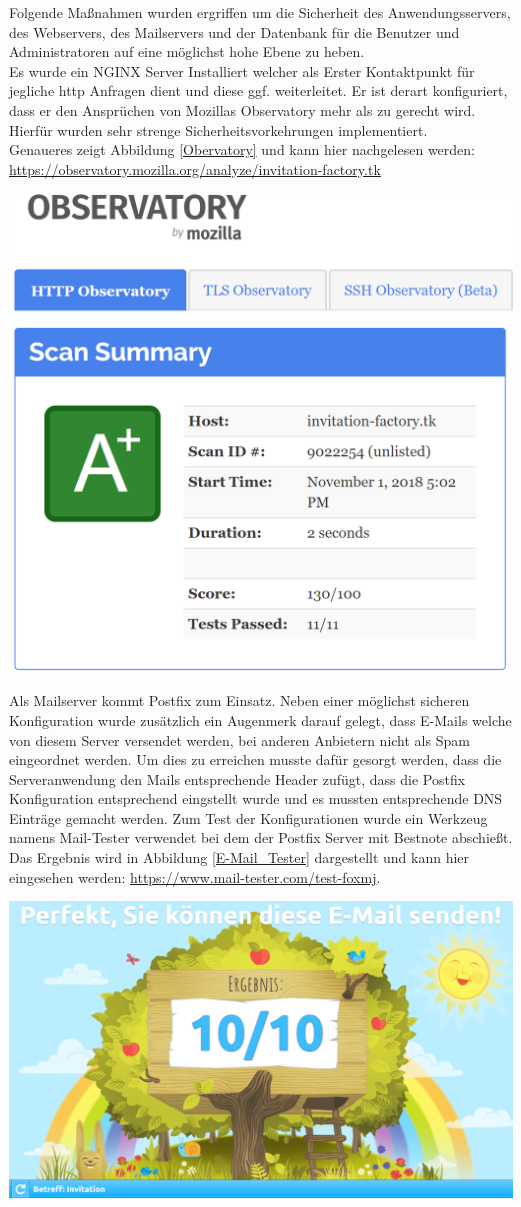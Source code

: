 \documentclass[landscape,a0paper,fontscale=0.35]{baposter} %
\begin{document}
\begin{poster}
{Folgende Maßnahmen wurden ergriffen um die Sicherheit des Anwendungsservers, des Webservers, des Mailservers und der Datenbank für die Benutzer und Administratoren auf eine möglichst hohe Ebene zu heben.\\ 
Es wurde ein NGINX Server Installiert welcher als Erster Kontaktpunkt für jegliche http Anfragen dient und diese ggf. weiterleitet. Er ist derart konfiguriert, dass er den Ansprüchen von Mozillas Observatory mehr als zu gerecht wird. Hierfür wurden sehr strenge Sicherheitsvorkehrungen implementiert.\\ Genaueres zeigt Abbildung \ref{Obervatory} und kann hier nachgelesen werden: \url{https://observatory.mozilla.org/analyze/invitation-factory.tk}
\begin{center}
	\includegraphics[width=0.45\linewidth]{Observatory.PNG}
	\label{Obervatory}
\end{center}
Als Mailserver kommt Postfix zum Einsatz. Neben einer möglichst sicheren Konfiguration wurde zusätzlich ein Augenmerk darauf gelegt, dass E-Mails welche von diesem Server versendet werden, bei anderen Anbietern nicht als Spam eingeordnet werden. Um dies zu erreichen musste dafür gesorgt werden, dass die Serveranwendung den Mails entsprechende Header zufügt, dass die Postfix Konfiguration entsprechend eingstellt wurde und es mussten entsprechende DNS Einträge gemacht werden. Zum Test der Konfigurationen wurde ein Werkzeug namens Mail-Tester verwendet bei dem der Postfix Server mit Bestnote abschießt. Das Ergebnis wird in Abbildung \ref{E-Mail_Tester} dargestellt und kann hier eingesehen werden: \url{https://www.mail-tester.com/test-foxmj}.
\begin{center}
	\includegraphics[width=0.5\linewidth]{E-Mail_test.PNG}

\end{center}}
\end{poster}
\end{document}

